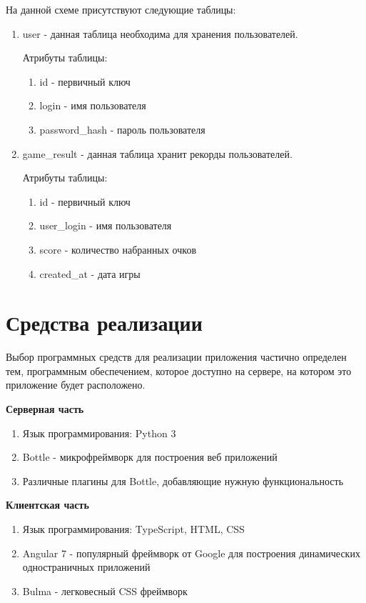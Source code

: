 \documentclass[hidelinks]{article}
\begin{document}
На данной схеме присутствуют следующие таблицы:
\begin{enumerate}
    \item user - данная таблица необходима для хранения пользователей.

    Атрибуты таблицы:
    \begin{enumerate}
        \item id - первичный ключ
        \item login - имя пользователя
        \item password\_hash - пароль пользователя
    \end{enumerate}
    \item game\_result - данная таблица хранит рекорды пользователей.
    
    Атрибуты таблицы:
    \begin{enumerate}
        \item id - первичный ключ
        \item user\_login - имя пользователя
        \item score - количество набранных очков
        \item created\_at - дата игры
    \end{enumerate}
\end{enumerate}

\section{Средства реализации}
Выбор программных средств для реализации приложения частично определен тем, программным обеспечением, которое доступно на сервере, на котором это приложение будет расположено.

\textbf{Серверная часть}
\begin{enumerate}
    \item Язык программирования: Python 3
    \item Bottle - микрофреймворк для построения веб приложений
    \item Различные плагины для Bottle, добавляющие нужную функциональность
\end{enumerate}

\textbf{Клиентская часть}
\begin{enumerate}
    \item Язык программирования: TypeScript, HTML, CSS
    \item Angular 7 - популярный фреймворк от Google для построения динамических одностраничных приложений
    \item Bulma - легковесный CSS фреймворк
\end{enumerate}
\end{document}

